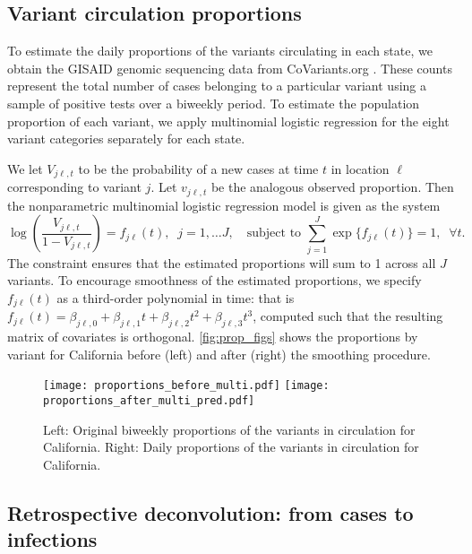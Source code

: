 
\subsection{Variant circulation proportions}
\label{sec:variant-proportions}

To estimate the daily proportions of the variants circulating in each state, we
obtain the GISAID genomic sequencing data from CoVariants.org
\citep{hodcroft2021covariants, elbe2017data}. These counts represent the total
number of cases belonging to a particular variant using
a sample of positive tests over a biweekly period. To estimate the population
proportion of each variant, we apply multinomial logistic regression 
for the eight variant categories separately for each state.

We let $V_{j\ell,t}$ to be the probability of a new cases at time $t$ in location
$\ell$ corresponding to variant $j$. Let $v_{j\ell,t}$ be the analogous observed
proportion. Then the nonparametric multinomial logistic regression model is given
as the system
\begin{equation}
\log\left(\frac{V_{j\ell,t}}{1-V_{j\ell,t}}\right) = f_{j\ell}(t),\;\; j=1,\ldots J,\quad
\textrm{subject to }\sum_{j=1}^J \exp\{f_{j\ell}(t)\} = 1, \;\;\forall t.
\end{equation}
The constraint ensures that the estimated proportions will sum to 1 across all
$J$ variants. To encourage smoothness of the estimated proportions, we specify
$f_{j\ell}(t)$ as a third-order polynomial in time: that is $f_{j\ell}(t) =
\beta_{j\ell,0} + \beta_{j\ell,1} t + \beta_{j\ell,2}t^2 + \beta_{j\ell,3}t^3$,
computed such that the resulting matrix of covariates is orthogonal. \autoref{fig:prop_figs} shows the proportions by variant for California before
(left) and after (right) the smoothing procedure. 

\begin{figure}[!tb]
\centering
    \texttt{[image: proportions\_before\_multi.pdf]}
    \texttt{[image: proportions\_after\_multi\_pred.pdf]}
    \caption{Left: Original biweekly proportions of the variants in circulation for California.
    Right: Daily proportions of the variants in circulation for California.}
    \label{fig:prop_figs}
\end{figure}

\subsection{Retrospective deconvolution: from cases to infections}
\label{sec:deconvolution}

